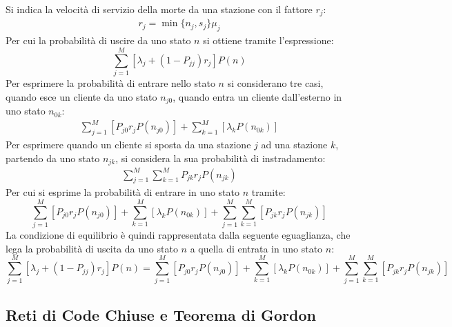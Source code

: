 \documentclass{article}
\numberwithin{equation}{subsection}
\begin{document}
Si indica la velocità di servizio della morte da una stazione con il fattore $r_j$:
\begin{gather*}
    r_j=\min\{n_j,s_j\}\mu_j
\end{gather*}
Per cui la probabilità di uscire da uno stato $n$ si ottiene tramite l'espressione:
\begin{equation*}
    \displaystyle\sum_{j=1}^M[\lambda_j+(1-P_{jj})r_j]P(n)
\end{equation*}
Per esprimere la probabilità di entrare nello stato $n$ si considerano tre casi, quando esce un cliente da uno stato $n_{j0}$, quando entra un cliente dall'esterno in 
uno stato $n_{0k}$: 
\begin{gather*}
    \displaystyle\sum_{j=1}^M\left[P_{j0}r_jP(n_{j0})\right]+\displaystyle\sum_{k=1}^M\left[\lambda_kP(n_{0k})\right]
\end{gather*}
Per esprimere quando un cliente si sposta da una stazione $j$ ad una stazione $k$, partendo da uno stato $n_{jk}$, si considera la sua probabilità di instradamento:
\begin{gather*}
    \displaystyle\sum_{j=1}^M\sum_{k=1}^MP_{jk}r_jP(n_{jk})
\end{gather*}
Per cui si esprime la probabilità di entrare in uno stato $n$ tramite:
\begin{equation*}
    \displaystyle\sum_{j=1}^M\left[P_{j0}r_jP(n_{j0})\right]+\displaystyle\sum_{k=1}^M\left[\lambda_kP(n_{0k})\right]+\sum_{j=1}^M\sum_{k=1}^M\left[P_{jk}r_jP(n_{jk})\right]
\end{equation*}
La condizione di equilibrio è quindi rappresentata dalla seguente eguaglianza, che lega la probabilità di uscita da uno stato $n$ a quella di entrata in uno stato $n$:
\begin{equation}
    \displaystyle\sum_{j=1}^M[\lambda_j+(1-P_{jj})r_j]P(n)=\sum_{j=1}^M\left[P_{j0}r_jP(n_{j0})\right]+\displaystyle\sum_{k=1}^M\left[\lambda_kP(n_{0k})\right]+\sum_{j=1}^M\sum_{k=1}^M\left[P_{jk}r_jP(n_{jk})\right]
\end{equation}

\subsection{Reti di Code Chiuse e Teorema di Gordon}
\end{document}
